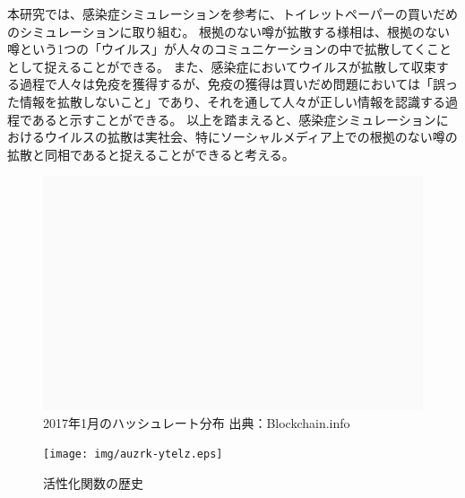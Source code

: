 本研究では、感染症シミュレーションを参考に、トイレットペーパーの買いだめのシミュレーションに取り組む。
根拠のない噂が拡散する様相は、根拠のない噂という1つの「ウイルス」が人々のコミュニケーションの中で拡散してくこととして捉えることができる。
また、感染症においてウイルスが拡散して収束する過程で人々は免疫を獲得するが、免疫の獲得は買いだめ問題においては「誤った情報を拡散しないこと」であり、それを通して人々が正しい情報を認識する過程であると示すことができる。
以上を踏まえると、感染症シミュレーションにおけるウイルスの拡散は実社会、特にソーシャルメディア上での根拠のない噂の拡散と同相であると捉えることができると考える。


\begin{figure}[h]
    \begin{center}
        \includegraphics[scale=15cm]{img/hashrate.png}
        \caption{2017年1月のハッシュレート分布 出典：Blockchain.info\cite{bitcoinhashrate}}
        \label{img:hashrate}
    \end{center}
\end{figure}
\fi

\begin{figure}[hbtp]
\texttt{[image: img/auzrk-ytelz.eps]}
	\caption{活性化関数の歴史}
	\label{history_af}
\end{figure}
\fi